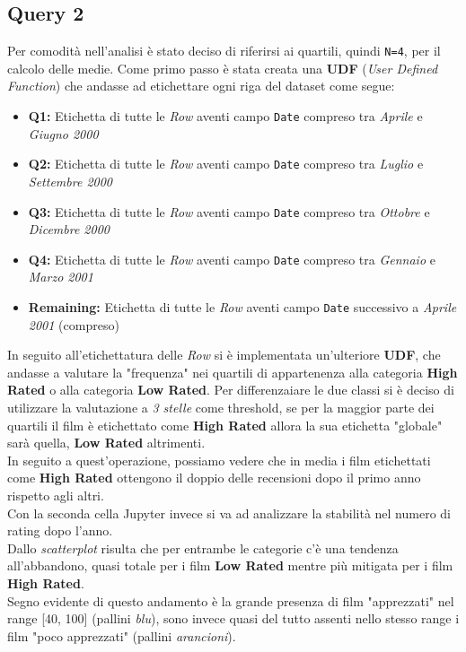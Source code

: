\documentclass{article}
\begin{document}
    \subsection{Query 2}
        Per comodità nell'analisi è stato deciso di riferirsi ai quartili, quindi \texttt{N=4}, per il calcolo delle medie. Come primo passo è stata creata una \textbf{UDF} (\textit{User Defined Function}) che andasse ad etichettare ogni riga del dataset come segue:
        \begin{itemize}
            \item \textbf{Q1:} Etichetta di tutte le \textit{Row} aventi campo \texttt{Date} compreso tra \textit{Aprile} e \textit{Giugno 2000}
            \item \textbf{Q2:} Etichetta di tutte le \textit{Row} aventi campo \texttt{Date} compreso tra \textit{Luglio} e \textit{Settembre 2000}
            \item \textbf{Q3:} Etichetta di tutte le \textit{Row} aventi campo \texttt{Date} compreso tra \textit{Ottobre} e \textit{Dicembre 2000}
            \item \textbf{Q4:} Etichetta di tutte le \textit{Row} aventi campo \texttt{Date} compreso tra \textit{Gennaio} e \textit{Marzo 2001}
            \item \textbf{Remaining:} Etichetta di tutte le \textit{Row} aventi campo \texttt{Date} successivo a \textit{Aprile 2001} (compreso)
        \end{itemize}
        In seguito all'etichettatura delle \textit{Row} si è implementata un'ulteriore \textbf{UDF}, che andasse a valutare la "frequenza" nei quartili di appartenenza alla categoria \textbf{High Rated} o alla categoria \textbf{Low Rated}. Per differenzaiare le due classi si è deciso di utilizzare la valutazione a \textit{3 stelle} come threshold, se per la maggior parte dei quartili il film è etichettato come \textbf{High Rated} allora la sua etichetta "globale" sarà quella, \textbf{Low Rated} altrimenti.\\
        In seguito a quest'operazione, possiamo vedere che in media i film etichettati come \textbf{High Rated} ottengono il doppio delle recensioni dopo il primo anno rispetto agli altri.\\
        Con la seconda cella Jupyter invece si va ad analizzare la stabilità nel numero di rating dopo l'anno.\\
        Dallo \textit{scatterplot} risulta che per entrambe le categorie c'è una tendenza all'abbandono, quasi totale per i film \textbf{Low Rated} mentre più mitigata per i film \textbf{High Rated}.\\
        Segno evidente di questo andamento è la grande presenza di film "apprezzati" nel range [40, 100] (pallini \textit{blu}), sono invece quasi del tutto assenti nello stesso range i film "poco apprezzati" (pallini \textit{arancioni}).
    
\end{document}
